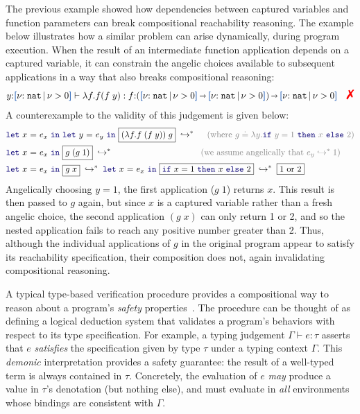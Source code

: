 The previous example showed how dependencies between captured
variables and function parameters can break compositional reachability
reasoning.  The example below illustrates how a similar problem can
arise dynamically, during program execution. When the result of an
intermediate function application depends on a captured variable, it
can constrain the angelic choices available to subsequent applications
in a way that also breaks compositional reasoning:
\vspace{-0.2em}
\begin{align*}
  y{:}\urt{\Nat}{\vnu > 0} \vdash \lambda f. f(f\;y) : f{:}(\urt{\Nat}{\vnu > 0}\sarr \urt{\Nat}{\vnu > 0}) \sarr \urt{\Nat}{\vnu > 0} \quad \judgfail
\end{align*}\noindent
A counterexample to the validity of this judgement is given below:
{ \setlength{\jot}{-1pt} %
\vspace{-0.2em}
\begin{align*}
  & \zlet{x}{e_x}{\zlet{y}{e_y}{\boxed{(\lambda f. f\;(f\;y))\;g}}} \;\hookrightarrow^*\;
  \quad  \text{\hfill\textcolor{gray}{(where $g \doteq \lambda y.\zif{y = 1}{x}{2}$)}}
  \\& \zlet{x}{e_x}{\boxed{g\;(g\;1)}} \;\hookrightarrow^*\;  \hspace{1.38in}
  \text{\textcolor{gray}{\hfill(we assume angelically that $e_y \hookrightarrow^* 1$)}}
    \\& \zlet{x}{e_x}{\boxed{g\;x}} \;\hookrightarrow^*\; \zlet{x}{e_x}{\boxed{\zif{x = 1}{x}{2}}} \;\hookrightarrow^*\; \boxed{1 \text{ or } 2}
\end{align*}
}
\noindent
Angelically choosing $y = 1$, the first application ($g\; 1$) returns
$x$. This result is then passed to $g$ again, but since $x$ is a
captured variable rather than a fresh angelic choice, the second
application $(g\; x)$ can only return 1 or 2, and so the nested
application fails to reach any positive number greater than 2. Thus,
although the individual applications of $g$ in the original program
appear to satisfy its reachability specification, their composition
does not, again invalidating compositional reasoning.

\iffalse
A typical type-based verification procedure provides a compositional
way to reason about a program's \emph{safety} properties~\cite{Milner+78}.
The procedure can be thought of as defining a logical deduction system
that validates a program's behaviors with respect to its type
specification.  For example, a typing judgement $\Gamma \vdash e :
\tau$ asserts that $e$ \emph{satisfies} the specification given by type
$\tau$ under a typing context $\Gamma$.  This \emph{demonic}
interpretation provides a safety guarantee: the result of a well-typed
term is always contained in $\tau$.  Concretely, the evaluation of $e$
\emph{may} produce a value in $\tau$'s denotation (but nothing else),
and must evaluate in \emph{all} environments whose bindings are
consistent with $\Gamma$.


